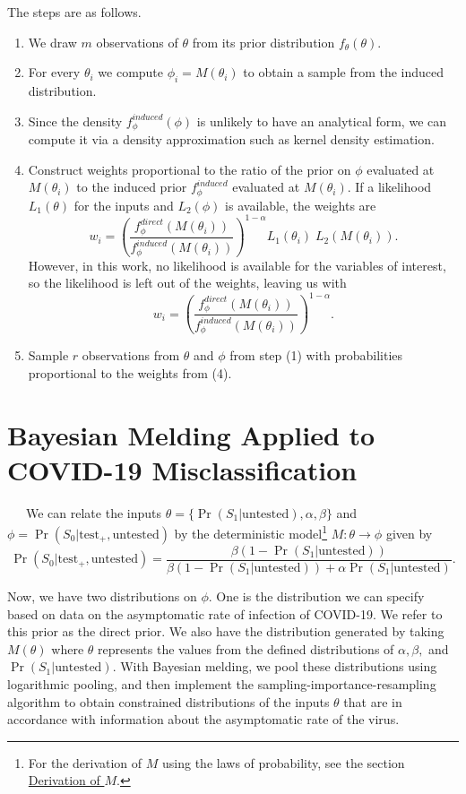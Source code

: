 \documentclass[12pt,twoside]{smiththesis}
\providecommand{\tightlist}{%
  \setlength{\itemsep}{0pt}\setlength{\parskip}{0pt}}
\begin{document}
The steps are as follows.
\begin{enumerate}
\def\labelenumi{\arabic{enumi}.}
\tightlist
\item
  We draw \(m\) observations of \(\theta\) from its prior distribution \(f_\theta(\theta)\).
\item
  For every \(\theta_i\) we compute \(\phi_i = M(\theta_i)\) to obtain a sample from the induced distribution.
\item
  Since the density \(f_\phi^{induced}(\phi)\) is unlikely to have an analytical form, we can compute it via a density approximation such as kernel density estimation.
\item
  Construct weights proportional to the ratio of the prior on \(\phi\) evaluated at \(M(\theta_i)\) to the induced prior \(f_\phi^{induced}\) evaluated at \(M(\theta_i)\). If a likelihood \(L_1(\theta)\) for the inputs and \(L_2(\phi)\) is available, the weights are
  \[w_i = \left( \frac{f_\phi^{direct}(M(\theta_i))}{f_\phi^{induced}(M(\theta_i))} \right)^{1-\alpha}L_1(\theta_i) \; L_2(M(\theta_i)).\]
  However, in this work, no likelihood is available for the variables of interest, so the likelihood is left out of the weights, leaving us with
  \[w_i = \left( \frac{f_\phi^{direct}(M(\theta_i))}{f_\phi^{induced}(M(\theta_i))} \right)^{1-\alpha}.\]
\item
  Sample \(r\) observations from \(\theta\) and \(\phi\) from step (1) with probabilities proportional to the weights from (4).
\end{enumerate}
\newpage

\hypertarget{meld}{%
\section{Bayesian Melding Applied to COVID-19 Misclassification}\label{meld}}

~~~We can relate the inputs \(\theta = \{\Pr(S_1|\text{untested}), \alpha, \beta \}\) and \(\phi = \Pr(S_0|\text{test}_+,\text{untested})\) by the deterministic model\footnote{For the derivation of \(M\) using the laws of probability, see the section \protect\hyperlink{derivation}{Derivation of \(M\)}.} \(M: \theta \to \phi\) given by \[\Pr(S_0|\text{test}_+, \text{untested}) = \dfrac{\beta(1 - \Pr(S_1|\text{untested}))}{\beta(1-\Pr(S_1|\text{untested})) + \alpha \Pr(S_1|\text{untested})}.\]

Now, we have two distributions on \(\phi\). One is the distribution we can specify based on data on the asymptomatic rate of infection of COVID-19. We refer to this prior as the direct prior. We also have the distribution generated by taking \(M(\theta)\) where \(\theta\) represents the values from the defined distributions of \(\alpha,\beta,\) and \(\Pr(S_1|\text{untested})\). With Bayesian melding, we pool these distributions using logarithmic pooling, and then implement the sampling-importance-resampling algorithm to obtain constrained distributions of the inputs \(\theta\) that are in accordance with information about the asymptomatic rate of the virus.
\end{document}
